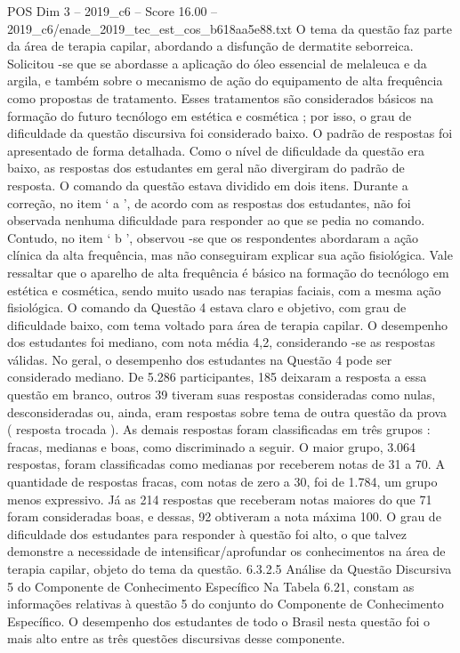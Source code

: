 \begin{textsample}{POS Dim 3 – 2019\_c6 – Score 16.00 – 2019\_c6/enade\_2019\_tec\_est\_cos\_b618aa5e88.txt}
O tema da questão faz parte da área de terapia capilar, abordando a disfunção de dermatite seborreica.
Solicitou -se que se abordasse a aplicação do óleo essencial de melaleuca e da argila, e também sobre o mecanismo de ação do equipamento de alta frequência como propostas de tratamento.
Esses tratamentos são considerados básicos na formação do futuro tecnólogo em estética e cosmética ; por isso, o grau de dificuldade da questão discursiva foi considerado baixo.
O padrão de respostas foi apresentado de forma detalhada.
Como o nível de dificuldade da questão era baixo, as respostas dos estudantes em geral não divergiram do padrão de resposta.
O comando da questão estava dividido em dois itens.
Durante a correção, no item ‘ a ’, de acordo com as respostas dos estudantes, não foi observada nenhuma dificuldade para responder ao que se pedia no comando.
Contudo, no item ‘ b ’, observou -se que os respondentes abordaram a ação clínica da alta frequência, mas não conseguiram explicar sua ação fisiológica.
Vale ressaltar que o aparelho de alta frequência é básico na formação do tecnólogo em estética e cosmética, sendo muito usado nas terapias faciais, com a mesma ação fisiológica.
O comando da Questão 4 estava claro e objetivo, com grau de dificuldade baixo, com tema voltado para área de terapia capilar.
O desempenho dos estudantes foi mediano, com nota média 4,2, considerando -se as respostas válidas.
No geral, o desempenho dos estudantes na Questão 4 pode ser considerado mediano.
De 5.286 participantes, 185 deixaram a resposta a essa questão em branco, outros 39 tiveram suas respostas consideradas como nulas, desconsideradas ou, ainda, eram respostas sobre tema de outra questão da prova ( resposta trocada ).
As demais respostas foram classificadas em três grupos : fracas, medianas e boas, como discriminado a seguir.
O maior grupo, 3.064 respostas, foram classificadas como medianas por receberem notas de 31 a 70.
A quantidade de respostas fracas, com notas de zero a 30, foi de 1.784, um grupo menos expressivo.
Já as 214 respostas que receberam notas maiores do que 71 foram consideradas boas, e dessas, 92 obtiveram a nota máxima 100.
O grau de dificuldade dos estudantes para responder à questão foi alto, o que talvez demonstre a necessidade de intensificar/aprofundar os conhecimentos na área de terapia capilar, objeto do tema da questão. 6.3.2.5 Análise da Questão Discursiva 5 do Componente de Conhecimento Específico Na Tabela 6.21, constam as informações relativas à questão 5 do conjunto do Componente de Conhecimento Específico.
O desempenho dos estudantes de todo o Brasil nesta questão foi o mais alto entre as três questões discursivas desse componente.

\end{textsample}
